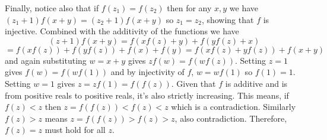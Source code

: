 \documentclass[11pt,a4paper]{article}
\begin{document}
\begin{enumerate}
	Finally, notice also that if $f(z_1)=f(z_2)$ then for any $x, y$ we have $(z_1+1)f(x+y)=(z_2+1)f(x+y)$ so $z_1=z_2$, showing that $f$ is injective. 
	Combined with the additivity of the functions we have 
	\[
	(z + 1)f(x + y) = f(xf(z) + y) + f(yf(z) + x) 
	\]\[= f(xf(z)) + f(yf(z)) + f(x)+ f(y) = f(xf(z) + yf(z)) + f(x+ y) 
	\]
	and again substituting $w=x+y$ gives $zf(w)=f(wf(z))$. Setting $z=1$ gives $f(w)=f(wf(1))$ and by injectivity of $f$, $w=wf(1)$ so $f(1)=1$. Setting $w=1$ gives $z=zf(1)=f(f(z))$. Given that $f$ is additive and is from positive reals to positive reals, it's also strictly increasing. This means, if $f(z)<z$ then $z=f(f(z))<f(z)<z$ which is a contradiction. Similarly $f(z)>z$ means $z=f(f(z))>f(z)>z$, also contradiction. Therefore, $f(z)=z$ must hold for all $z$. 
\end{enumerate}
\end{document}
